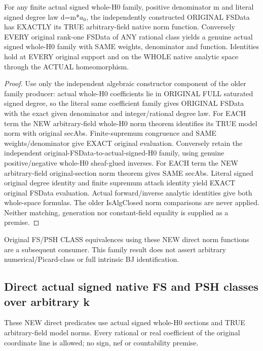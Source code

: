 \begin{theorem}
\label{thm:seven-native-signed-family-dictionaries-arbitrary-field}
\leanok
For any finite actual signed whole-H0 family, positive denominator m
and literal signed degree law d=m*$a_0$, the independently constructed
ORIGINAL FSData has EXACTLY its TRUE arbitrary-field native norm
function. Conversely EVERY original rank-one FSData of ANY rational
class yields a genuine actual signed whole-H0 family with SAME weights,
denominator and function. Identities hold at EVERY original support and
on the WHOLE native analytic space through the ACTUAL homeomorphism.
\end{theorem}
\begin{proof}
Use only the independent algebraic constructor component of the older
family producer: actual whole-H0 coefficients lie in ORIGINAL FULL
saturated signed degree, so the literal same coefficient family gives
ORIGINAL FSData with the exact given denominator and integer/rational
degree law. For EACH term the NEW arbitrary-field whole-H0 norm theorem
identifies its TRUE model norm with original secAbs. Finite-supremum
congruence and SAME weights/denominator give EXACT original evaluation.
Conversely retain the independent original-FSData-to-actual-signed-H0
family, using genuine positive/negative whole-H0 sheaf-glued inverses.
For EACH term the NEW arbitrary-field original-section norm theorem
gives SAME secAbs. Literal signed original degree identity and finite
supremum attach identity yield EXACT original FSData evaluation. Actual
forward/inverse analytic identities give both whole-space formulas.
The older IsAlgClosed norm comparisons are never applied. Neither
matching, generation nor constant-field equality is supplied as a premise.
\end{proof}

Original FS/PSH CLASS equivalences using these NEW direct norm functions
are a subsequent consumer. This family result does not assert arbitrary
numerical/Picard-class or full intrinsic BJ identification.

\subsection{Direct actual signed native FS and PSH classes over arbitrary k}
These NEW direct predicates use actual signed whole-H0 sections and TRUE
arbitrary-field model norms. Every rational or real coefficient of the
original coordinate line is allowed; no sign, nef or countability premise.

